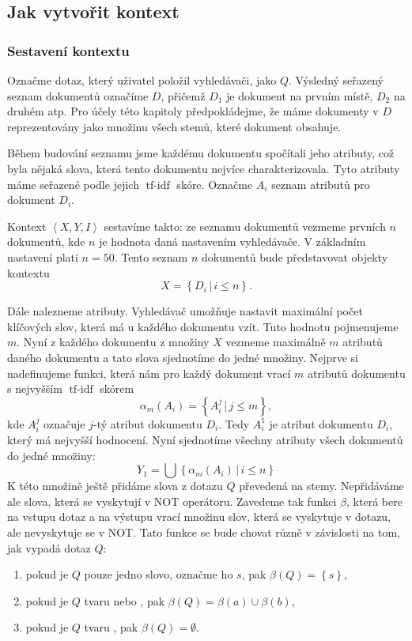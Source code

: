 \documentclass[12pt]{article}
\newcommand{\sep}{\,|\,}
\newcommand{\ssection}[1]{\subsection{#1}}
\newcommand{\sssection}[1]{\subsubsection{#1}}
\newcommand{\adds}[1]{\left\{#1\right\}}
\newcommand{\addsp}[1]{\left<#1\right>}
\DeclareMathOperator{\tfidf}{tf-idf}
\newcommand{\context}{\addsp{X, Y, I}}
\begin{document}
\ssection{Jak vytvořit kontext}
\sssection{Sestavení kontextu}
\label{ch.sestaveni}
Označme dotaz, který uživatel položil vyhledávači, jako $Q$. Výsledný seřazený seznam dokumentů označíme $D$, přičemž $D_1$ je dokument na prvním místě, $D_2$ na druhém atp. Pro účely této kapitoly předpokládejme, že máme dokumenty v $D$ reprezentovány jako množinu všech stemů, které dokument obsahuje. 

Během budování seznamu jsme každému dokumentu spočítali jeho atributy, což byla nějaká slova, která tento dokumentu nejvíce charakterizovala. Tyto atributy máme seřazené podle jejich $\tfidf$ skóre. Označme $A_i$ seznam atributů pro dokument $D_i$.

Kontext $\context$ sestavíme takto: ze seznamu dokumentů vezmeme prvních $n$ dokumentů, kde $n$ je hodnota daná nastavením vyhledávače. V základním nastavení platí $n=50$. Tento seznam $n$ dokumentů bude představovat objekty kontextu
$$
X=\adds{D_i\sep i \le n}.
$$

Dále nalezneme atributy. Vyhledávač umožňuje nastavit maximální počet klíčových slov, která má u každého dokumentu vzít. Tuto hodnotu pojmenujeme $m$. Nyní z každého dokumentu z množiny $X$ vezmeme maximálně $m$ atributů daného dokumentu a tato slova sjednotíme do jedné množiny. Nejprve si nadefinujeme funkci, která nám pro každý dokument vrací $m$ atributů dokumentu s nejvyšším $\tfidf$ skórem
$$
\alpha_m(A_i)=\adds{A_i^j\sep j\le m},
$$
kde $A_i^j$ označuje $j$-tý atribut dokumentu $D_i$. Tedy $A_i^1$ je atribut dokumentu $D_i$, který má nejvyšší hodnocení. Nyní sjednotíme všechny atributy všech dokumentů do jedné množiny:
$$
Y_1=\bigcup\adds{\alpha_m(A_i)\sep i \le n}
$$
K této množině ještě přidáme slova z dotazu $Q$ převedená na stemy. Nepřidáváme ale slova, která se vyskytují v NOT operátoru. Zavedeme tak funkci $\beta$, která bere na vstupu dotaz a na výstupu vrací množinu slov, která se vyskytuje v dotazu, ale nevyskytuje se v NOT. Tato funkce se bude chovat různě v závislosti na tom, jak vypadá dotaz $Q$:

\begin{enumerate}
	\item pokud je $Q$ pouze jedno slovo, označme ho $s$, pak $\beta(Q)=\adds{s}$,
	\item pokud je $Q$ tvaru  nebo , pak $\beta(Q)=\beta(a)\cup\beta(b)$,
	\item pokud je $Q$ tvaru , pak $\beta(Q)=\emptyset$.
\end{enumerate}
\end{document}
